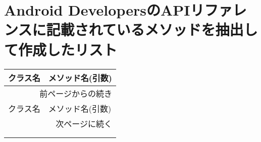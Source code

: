 \appendix
\section{Android DevelopersのAPIリファレンスに記載されているメソッドを抽出して作成したリスト}
\label{tab:HTMLList}
\begingroup
{}
\begin{landscape}
\begin{longtable}{lp{160mm}}
  \\
  

  \hline
  クラス名 & メソッド名(引数) \\ \hline
  \endfirsthead
  \multicolumn{2}{r}{前ページからの続き} \\ \hline
  クラス名 & メソッド名(引数) \\ \hline
  \endhead
  \hline
  \multicolumn{2}{r}{次ページに続く} \\
  \endfoot
  \hline
  \multicolumn{2}{r}{以上} \\
  \endlastfoot
  

\end{longtable}
\end{landscape}
